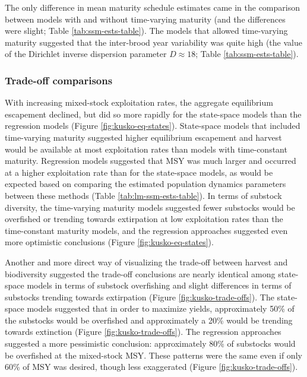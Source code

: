 \documentclass[12pt,]{book}
\theoremstyle{definition}
\theoremstyle{definition}
\theoremstyle{definition}
\theoremstyle{remark}
\begin{document}
The only difference in mean maturity schedule estimates came in the
comparison between models with and without time-varying maturity (and
the differences were slight; Table \ref{tab:ssm-ests-table}). The models
that allowed time-varying maturity suggested that the inter-brood year
variability was quite high (the value of the Dirichlet inverse
dispersion parameter \(D \approx 18\); Table \ref{tab:ssm-ests-table}).

\subsubsection{Trade-off comparisons}\label{trade-off-comparisons}

\noindent
With increasing mixed-stock exploitation rates, the aggregate
equilibrium escapement declined, but did so more rapidly for the
state-space models than the regression models (Figure
\ref{fig:kusko-eq-states}). State-space models that included
time-varying maturity suggested higher equilibrium escapement and
harvest would be available at most exploitation rates than models with
time-constant maturity. Regression models suggested that MSY was much
larger and occurred at a higher exploitation rate than for the
state-space models, as would be expected based on comparing the
estimated population dynamics parameters between these methods (Table
\ref{tab:lm-ssm-ests-table}). In terms of substock diversity, the
time-varying maturity models suggested fewer substocks would be
overfished or trending towards extirpation at low exploitation rates
than the time-constant maturity models, and the regression approaches
suggested even more optimistic conclusions (Figure
\ref{fig:kusko-eq-states}).

Another and more direct way of visualizing the trade-off between harvest
and biodiversity suggested the trade-off conclusions are nearly
identical among state-space models in terms of substock overfishing and
slight differences in terms of substocks trending towards extirpation
(Figure \ref{fig:kusko-trade-offs}). The state-space models suggested
that in order to maximize yields, approximately 50\% of the substocks
would be overfished and approximately a 20\% would be trending towards
extinction (Figure \ref{fig:kusko-trade-offs}). The regression
approaches suggested a more pessimistic conclusion: approximately 80\%
of substocks would be overfished at the mixed-stock MSY. These patterns
were the same even if only 60\% of MSY was desired, though less
exaggerated (Figure \ref{fig:kusko-trade-offs}).
\end{document}
